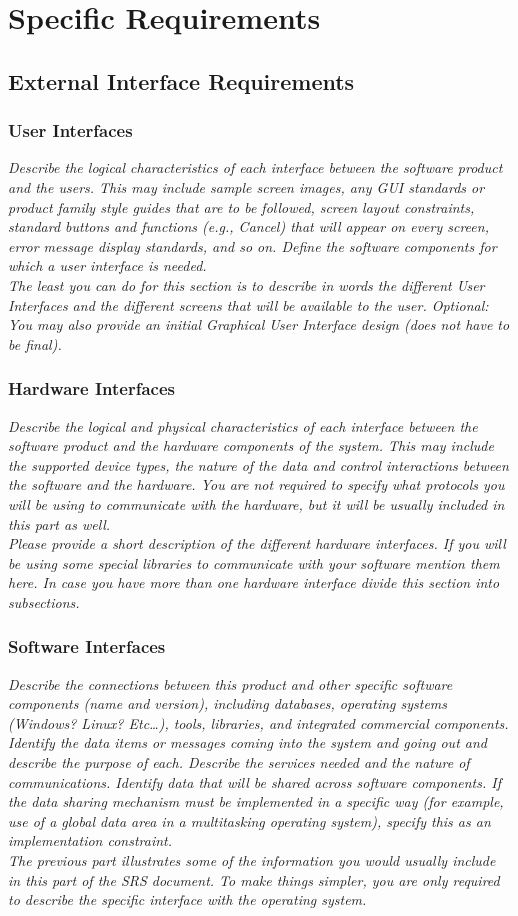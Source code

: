 \documentclass{article}
\newcommand{\gnl}{\vspace{1em}\\}      %
\begin{document}
\section{Specific Requirements}
    \subsection{External Interface Requirements}
        \subsubsection{User Interfaces}
            \emph{Describe the logical characteristics of each interface between the software product and the users. This may include sample screen images, any GUI standards or product family style guides that are to be followed, screen layout constraints, standard buttons and functions (e.g., Cancel) that will appear on every screen, error message display standards, and so on. Define the software components for which a user interface is needed.\gnl The least you can do for this section is to describe in words the different User Interfaces and the different screens that will be available to the user. Optional: You may also provide an initial Graphical User Interface design (does not have to be final).}
        \subsubsection{Hardware Interfaces}
            \emph{Describe the logical and physical characteristics of each interface between the software product and the hardware components of the system. This may include the supported device types, the nature of the data and control interactions between the software and the hardware. You are not required to specify what protocols you will be using to communicate with the hardware, but it will be usually included in this part as well.\gnl Please provide a short description of the different hardware interfaces. If you will be using some special libraries to communicate with your software mention them here. In case you have more than one hardware interface divide this section into subsections.}
        \subsubsection{Software Interfaces}
            \emph{Describe the connections between this product and other specific software components (name and version), including databases, operating systems (Windows? Linux? Etc\dots), tools, libraries, and integrated commercial components. Identify the data items or messages coming into the system and going out and describe the purpose of each. Describe the services needed and the nature of communications. Identify data that will be shared across software components. If the data sharing mechanism must be implemented in a specific way (for example, use of a global data area in a multitasking operating system), specify this as an implementation constraint.\gnl The previous part illustrates some of the information you would usually include in this part of the SRS document. To make things simpler, you are only required to describe the specific interface with the operating system.}
\end{document}
